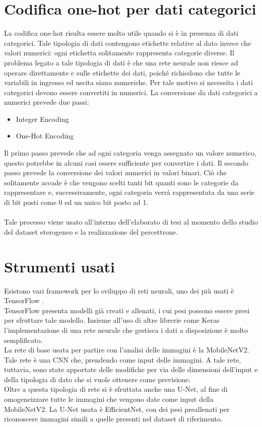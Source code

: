 \section{Codifica one-hot per dati categorici}
La codifica one-hot risulta essere molto utile quando si è in presenza di dati categorici. Tale tipologia di dati
contengono etichette relative al dato invece che valori numerici: ogni etichetta solitamente rappresenta 
categorie diverse.
Il problema legato a tale tipologia di dati è che una rete neurale non riesce ad operare direttamente c
sulle etichette dei dati, poiché richiedono che tutte le variabili in ingresso ed uscita siano numeriche.
Per tale motivo si necessita i dati categorici devono essere convertiti in numerici.
La conversione da dati categorici a numerici prevede due passi:
\begin{itemize}
    \item Integer Encoding
    \item One-Hot Encoding
\end{itemize}
Il primo passo prevede che ad ogni categoria venga assegnato un valore numerico, questo potrebbe in 
alcuni casi essere sufficiente per convertire i dati.
Il secondo passo prevede la conversione dei valori numerici in valori binari.
Ciò che solitamente accade è che vengono scelti tanti bit quanti sono le categorie da rappresentare 
e, successivamente, ogni categoria verrà rappresentata da una serie di bit posti come 0 ed un unico bit 
posto ad 1.
\\\\
Tale processo viene usato all'interno dell'elaborato di tesi al momento dello studio del dataset eterogeneo 
e la realizzazione del percettrone.
\section{Strumenti usati}
Esistono vari framework per lo sviluppo di reti neurali, uno dei più usati è TensorFlow \cite{tsf}. 
\\
TensorFlow presenta modelli già creati e allenati, i cui pesi possono essere presi per sfruttare tale modello.
Insieme all'uso di altre librerie come Keras l'implementazione di una rete neurale che gestisca i dati a disposizione 
è molto semplificato.
\\
La rete di base usata per partire con l'analisi delle immagini è la MobileNetV2. Tale rete è una CNN che, prendendo come input delle 
immagini.
A tale rete, tuttavia, sono state apportate delle modifiche per via delle dimensioni dell'input e della tipologia di dato 
che si vuole ottenere come previsione.
\\
Oltre a questa tipologia di rete si è sfruttata anche una U-Net, al fine di omogeneizzare tutte le immagini che vengono date come input della MobileNetV2.
La U-Net usata è EfficientNet, con dei pesi preallenati per riconoscere immagini simili a quelle presenti nel dataset di riferimento.


